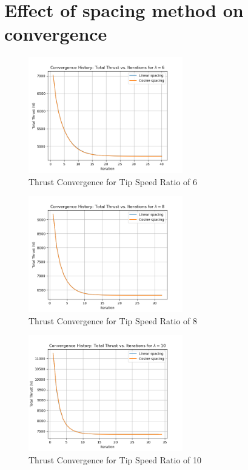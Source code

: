 \section{Effect of spacing method on convergence}
\begin{figure}[H]
    \centering
    \includegraphics[width=0.6\textwidth]{Figures/Spacing_method_6.png}
    \caption{Thrust Convergence for Tip Speed Ratio of 6}
    \label{fig:thrust convergence - lambda 6}
\end{figure}
\begin{figure}[H]
    \centering
    \includegraphics[width=0.6\textwidth]{Figures/spacing_method_8.png}
    \caption{Thrust Convergence for Tip Speed Ratio of 8}
    \label{fig:thrust convergence - lambda 8}
\end{figure}
\begin{figure}[H]
    \centering
    \includegraphics[width=0.6\textwidth]{Figures/spacing_method_10.png}
    \caption{Thrust Convergence for Tip Speed Ratio of 10}
    \label{fig:thrust convergence - lambda 10}
\end{figure}